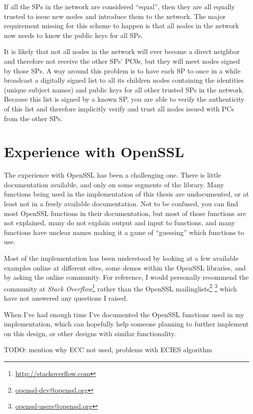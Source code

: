 If all the \acp{SP} in the network are considered ``equal'', then they are all
equally trusted to issue new nodes and introduce them to the network. The major
requirement missing for this scheme to happen is that all nodes in the network
now needs to know the public keys for all SPs.

It is likely that not all nodes in the network will ever become a direct
neighbor and therefore not receive the other SPs' \acp{PC0}, but they will meet
nodes signed by those SPs. A way around this problem is to have each \ac{SP} to
once in a while broadcast a digitally signed list to all its children nodes
containing the identities (unique subject names) and public keys for all other
trusted \acp{SP} in the network. Because this list is signed by a known
\ac{SP}, you are able to verify the authenticity of this list and therefore
implicitly verify and trust all nodes issued with PCs from the other SPs.

\section{Experience with OpenSSL}
The experience with OpenSSL has been a challenging one. There is little
documentation available, and only on some segments of the library. Many
functions being used in the implementation of this thesis are undocumented, or
at least not in a freely available documentation. Not to be confused, you can
find most OpenSSL functions in their documentation, but most of those functions
are not explained, many do not explain output and input to functions, and many
functions have unclear names making it a game of ``guessing'' which functions to
use.

Most of the implementation has been understood by looking at a few available
examples online at different sites, some demos within the OpenSSL libraries,
and by asking the online community. For reference, I would personally recommend the
community at \emph{Stack Overflow}\footnote{\url{http://stackoverflow.com}}
rather than the OpenSSL mailinglists\footnote{\url{openssl-dev@openssl.org}}
\footnote{\url{openssl-users@openssl.org}} which have not answered any
questions I raised.

When I've had enough time I've documented the OpenSSL functions used in my
implementation, which can hopefully help someone planning to further implement
on this design, or other designs with similar functionality.

TODO: mention why ECC not used, problems with ECIES algorithm